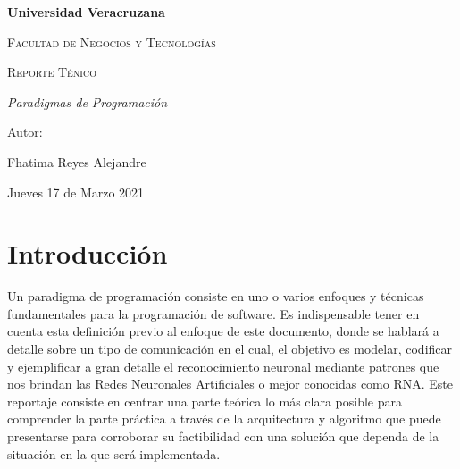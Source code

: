 \documentclass{report}
\begin{document}
\begin{titlepage}
\centering
{\bfseries\LARGE Universidad Veracruzana \par}
\vspace{1cm}
{\scshape\Large Facultad de Negocios y Tecnolog\'ias  \par}
\vspace{3cm}
{\scshape\Huge Reporte T\'enico \par}
\vspace{3cm}
{\itshape\Large Paradigmas de Programaci\'on \par}
\vfill
{\Large Autor: \par}
{\Large Fhatima Reyes Alejandre \par}
\vfill
{\large Jueves 17 de Marzo 2021 \par}

\end{titlepage}



\section{ Introducci\'on}
{\large Un paradigma de programaci\'on consiste en uno o varios enfoques y t\'ecnicas fundamentales para la programaci\'on de software. Es indispensable tener en cuenta esta definici\'on previo al enfoque de este documento, donde se hablar\'a a detalle sobre un tipo de comunicaci\'on en el cual, el objetivo es modelar, codificar y ejemplificar a gran detalle el reconocimiento neuronal mediante patrones que nos brindan las Redes Neuronales Artificiales o mejor conocidas como RNA. Este reportaje consiste en centrar una parte te\'orica lo m\'as clara posible para comprender la parte pr\'actica a trav\'es de la arquitectura y algoritmo que puede presentarse para corroborar su factibilidad con una soluci\'on que dependa de la situaci\'on en la que ser\'a implementada.}
\end{document}
